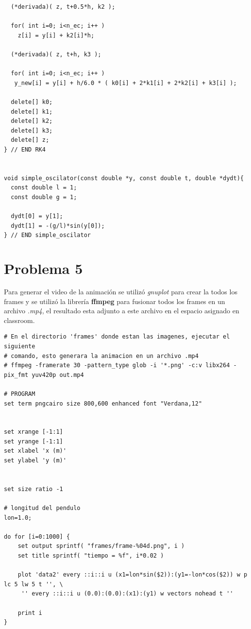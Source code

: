 \begin{lstlisting}
  (*derivada)( z, t+0.5*h, k2 );

  for( int i=0; i<n_ec; i++ )
    z[i] = y[i] + k2[i]*h;

  (*derivada)( z, t+h, k3 );

  for( int i=0; i<n_ec; i++ )
   y_new[i] = y[i] + h/6.0 * ( k0[i] + 2*k1[i] + 2*k2[i] + k3[i] );

  delete[] k0;
  delete[] k1;
  delete[] k2;
  delete[] k3;
  delete[] z;
} // END RK4


void simple_oscilator(const double *y, const double t, double *dydt){
  const double l = 1;
  const double g = 1;

  dydt[0] = y[1];
  dydt[1] = -(g/l)*sin(y[0]);
} // END simple_oscilator
\end{lstlisting}




\section*{Problema 5}
Para generar el video de la animación se utilizó \textit{gnuplot} para crear la todos los frames y se utilizó la librería \textbf{ffmpeg} para fusionar todos los frames en un archivo \textit{.mp4}, el resultado esta adjunto a este archivo en el espacio asignado en classroom.

\begin{lstlisting}
# En el directorio 'frames' donde estan las imagenes, ejecutar el siguiente
# comando, esto generara la animacion en un archivo .mp4
# ffmpeg -framerate 30 -pattern_type glob -i '*.png' -c:v libx264 -pix_fmt yuv420p out.mp4

# PROGRAM
set term pngcairo size 800,600 enhanced font "Verdana,12"


set xrange [-1:1]
set yrange [-1:1]
set xlabel 'x (m)'
set ylabel 'y (m)'


set size ratio -1

# longitud del pendulo
lon=1.0;

do for [i=0:1000] {
    set output sprintf( "frames/frame-%04d.png", i )
    set title sprintf( "tiempo = %f", i*0.02 )

    plot 'data2' every ::i::i u (x1=lon*sin($2)):(y1=-lon*cos($2)) w p lc 5 lw 5 t '', \
	 '' every ::i::i u (0.0):(0.0):(x1):(y1) w vectors nohead t ''

    print i
}
\end{lstlisting}




















